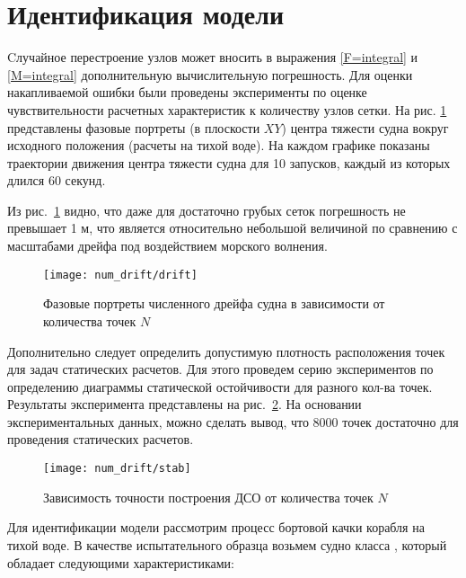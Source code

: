 \section{Идентификация модели}

Cлучайное перестроение узлов может вносить в выражения \eqref{F=integral} и \eqref{M=integral} дополнительную вычислительную погрешность. Для оценки накапливаемой ошибки были проведены эксперименты по оценке чувствительности расчетных характеристик к количеству узлов сетки. На рис. \ref{drift} представлены фазовые портреты  (в плоскости $XY$) центра тяжести судна вокруг исходного положения (расчеты на тихой воде). На каждом графике показаны траектории движения центра тяжести судна для 10 запусков, каждый из которых длился 60 секунд.

Из рис.~\ref{drift} видно, что даже для достаточно грубых сеток погрешность не превышает 1 м, что является относительно небольшой величиной по сравнению с масштабами дрейфа под воздействием морского волнения.

\begin{figure}[ht]
\begin{center}
\texttt{[image: num\_drift/drift]}
\end{center}
\caption{Фазовые портреты численного дрейфа судна в зависимости от количества точек $N$ }
\label{drift}
\end{figure}

Дополнительно следует определить допустимую плотность расположения точек для задач статических расчетов.
Для этого проведем серию экспериментов по определению диаграммы статической остойчивости для разного кол-ва точек. Результаты эксперимента представлены на рис.~\ref{drift:stabNN}. На основании экспериментальных данных, можно сделать вывод, что 8000 точек достаточно для проведения статических расчетов.

\begin{figure}[ht]
\begin{center}
\texttt{[image: num\_drift/stab]}
\end{center}
\caption{Зависимость точности построения ДСО от количества точек $N$ }
\label{drift:stabNN}
\end{figure}





Для идентификации модели рассмотрим процесс бортовой качки корабля на тихой воде.
В качестве испытательного образца возьмем судно класса , который обладает следующими характеристиками:

